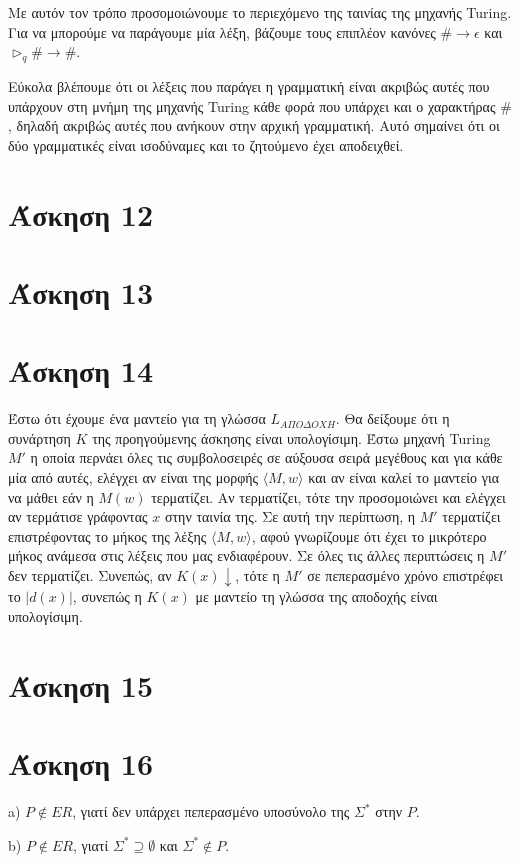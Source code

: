 \documentclass[a4paper, oneside, 11pt]{article}
\theoremstyle{definition}
\begin{document}
Με αυτόν τον τρόπο προσομοιώνουμε το περιεχόμενο της ταινίας της μηχανής Turing. Για να μπορούμε να παράγουμε μία λέξη, βάζουμε τους επιπλέον κανόνες
$\#\rightarrow \epsilon$ και $\triangleright_q \#\rightarrow \#$.

Εύκολα βλέπουμε ότι οι λέξεις που παράγει η γραμματική είναι ακριβώς αυτές που υπάρχουν στη μνήμη της μηχανής Turing κάθε φορά που υπάρχει και ο
χαρακτήρας $\#$, δηλαδή ακριβώς αυτές που ανήκουν στην αρχική γραμματική. Αυτό σημαίνει ότι οι δύο γραμματικές είναι ισοδύναμες και το ζητούμενο έχει
αποδειχθεί.

\section*{Άσκηση 12}
\section*{Άσκηση 13}
\section*{Άσκηση 14}
Έστω ότι έχουμε ένα μαντείο για τη γλώσσα $L_{A\Pi O\Delta OXH}$. Θα δείξουμε ότι η συνάρτηση $K$ της προηγούμενης άσκησης είναι υπολογίσιμη. Έστω μηχανή Turing $M'$ η οποία
περνάει όλες τις συμβολοσειρές σε αύξουσα σειρά μεγέθους και για κάθε μία από αυτές, ελέγχει αν είναι της μορφής $\langle M,w\rangle$ και αν είναι καλεί το μαντείο για να μάθει
εάν η $M(w)$ τερματίζει. Αν τερματίζει, τότε την προσομοιώνει και ελέγχει αν τερμάτισε γράφοντας $x$ στην ταινία της. Σε αυτή την περίπτωση, η $M'$ τερματίζει επιστρέφοντας
το μήκος της λέξης $\langle M, w\rangle$, αφού γνωρίζουμε ότι έχει το μικρότερο μήκος ανάμεσα στις λέξεις που μας ενδιαφέρουν. Σε όλες τις άλλες περιπτώσεις η $M'$ δεν τερματίζει.
Συνεπώς, αν $K(x)\downarrow$, τότε η $M'$ σε πεπερασμένο χρόνο επιστρέφει το $|d(x)|$, συνεπώς η $K(x)$ με μαντείο τη γλώσσα της αποδοχής είναι υπολογίσιμη.

\section*{Άσκηση 15}
\section*{Άσκηση 16}
a) $P\notin ER$, γιατί δεν υπάρχει πεπερασμένο υποσύνολο της $\Sigma^*$ στην $P$.

b) $P\notin ER$, γιατί $\Sigma^*\supseteq \emptyset$ και $\Sigma^*\notin P$.
\end{document}
